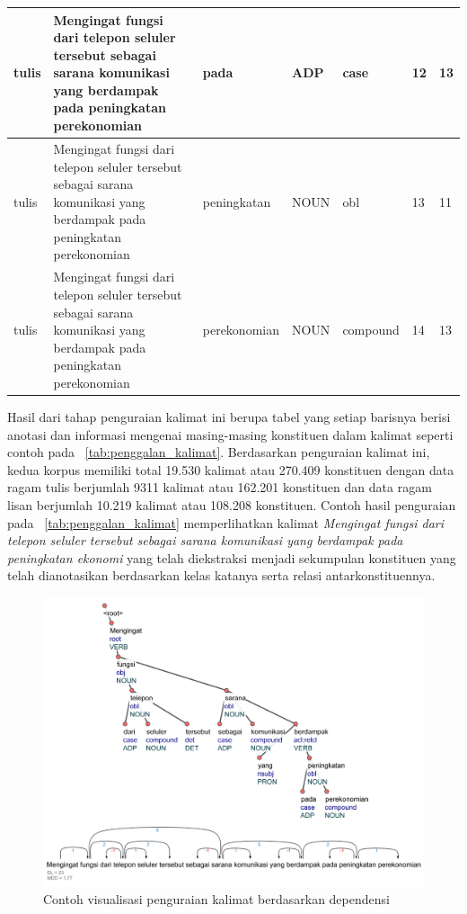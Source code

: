 \begin{center}
\begin{table}
\begin{tiny}
\begin{tabulary}{1\textwidth}{| L | L | L | L | L | L | L |}
tulis & Mengingat fungsi dari telepon seluler tersebut sebagai sarana komunikasi yang berdampak pada peningkatan perekonomian & pada & ADP & case & 12 & 13 \\ \hline
tulis & Mengingat fungsi dari telepon seluler tersebut sebagai sarana komunikasi yang berdampak pada peningkatan perekonomian & peningkatan & NOUN & obl & 13 & 11 \\ \hline
tulis & Mengingat fungsi dari telepon seluler tersebut sebagai sarana komunikasi yang berdampak pada peningkatan perekonomian & perekonomian & NOUN & compound & 14 & 13 \\ 
\hline
  \end{tabulary}  
\end{tiny}
\end{table}
\end{center}

Hasil dari tahap penguraian kalimat ini berupa tabel yang setiap barisnya berisi anotasi dan informasi mengenai masing-masing konstituen dalam kalimat seperti contoh pada \tab~\ref{tab:penggalan_kalimat}. Berdasarkan penguraian kalimat ini, kedua korpus memiliki total 19.530 kalimat atau 270.409 konstituen dengan data ragam tulis berjumlah 9311 kalimat atau 162.201 konstituen dan data ragam lisan berjumlah 10.219 kalimat atau 108.208 konstituen. Contoh hasil penguraian pada \tab~\ref{tab:penggalan_kalimat} memperlihatkan kalimat \textit{Mengingat fungsi dari telepon seluler tersebut sebagai sarana komunikasi yang berdampak pada peningkatan ekonomi} yang telah diekstraksi menjadi sekumpulan konstituen yang telah dianotasikan berdasarkan kelas katanya serta relasi antarkonstituennya. 

\begin{figure}
	\centering \includegraphics[width=1
	\textwidth] {pics/visualisasi_penguraian.jpg} 
	\caption{Contoh visualisasi penguraian kalimat berdasarkan dependensi} 
\label{fig:visualisasi_penguraian} \end{figure}

